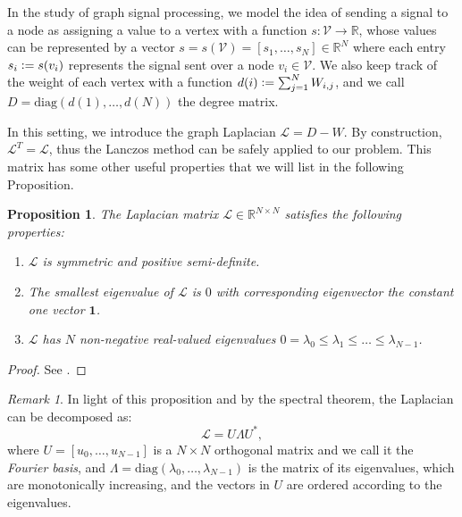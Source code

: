 \documentclass[11pt]{article}
\renewcommand{\mathbb}[1]{\mathds{#1}}
\newcommand{\R}{\mathbb{R}}
\newcommand{\V}{\mathcal{V}}
\renewcommand{\L}{\mathcal{L}}
\newcommand{\defeq}{\vcentcolon=}
\newtheorem{proposition}[theorem]{Proposition}
\theoremstyle{definition}
\theoremstyle{remark}
\newtheorem{remark}[theorem]{Remark}
\theoremstyle{experimental}
\begin{document}
In the study of graph signal processing, we model the idea of sending a signal to a node as
assigning a value to a vertex with a function $ s : \V \to \R$, whose values can be represented by a vector
$ s = s(\V) = [s_1, \dots, s_N] \in \R^N $ where each entry $ s_i \defeq s(v_i)$ represents
the signal sent over a node $ v_i \in \V$. We also keep track of the weight of each vertex
with a function $ d(i) \defeq \sum_{j=1}^N W_{i,j} $, and we call $D =
\text{diag}(d(1), \dots, d(N))$ the degree matrix.

In this setting, we introduce the graph Laplacian $ \L = D - W$. By
construction, $\L^T = \mathcal{L}$, thus the Lanczos method can be safely applied to our 
problem. This matrix has some other useful properties that we will list in the following Proposition.
\begin{proposition}
  The Laplacian matrix $ \L \in \R^{N\times N} $ satisfies the following properties:
  \begin{enumerate}
    \item $ \L $ is symmetric and positive semi-definite.
    \item The smallest eigenvalue of $ \L $ is $ 0 $ with corresponding eigenvector the constant one
      vector $ \mathbf{1} $.
    \item $ \L $ has $ N $ non-negative real-valued eigenvalues $ 0 = \lambda_0 \le \lambda_1 \le
      \ldots \le \lambda_{N-1}$.
  \end{enumerate}
\end{proposition}
\begin{proof}
  See \cite{von2007tutorial}.
\end{proof}


\begin{remark}
  In light of this proposition and by the spectral theorem, the Laplacian can be decomposed as:
  \begin{equation*}
    \L = U \Lambda U^{*},
  \end{equation*}
  where $ U = \left[ u_0,\dots,u_{N-1} \right]$ is a $ N\times N $ orthogonal matrix and we call it
  the \emph{Fourier basis}, and $ \Lambda =
  \text{diag}\left(\lambda_0, \dots, \lambda_{N-1}\right)$ is the matrix of its eigenvalues, which
  are monotonically increasing, and the vectors in $ U $ are ordered according to the eigenvalues.
  \end{remark}
\end{document}
